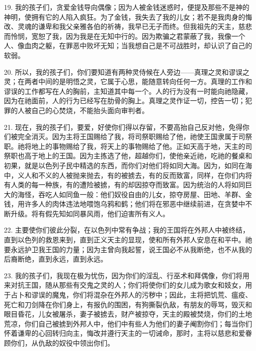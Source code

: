 19. 我的孩子们，贪爱金钱导向偶像；因为人被金钱迷惑时，便提及那些不是神的神明，使拥有它的人陷入疯狂。为了金钱，我失去了我的儿女；若不是我肉身的悔改、灵魂的谦卑和我父亲雅各伯的祈祷，我早已无子而终。但我祖先的天主，慈悲而怜悯，宽恕了我，因为我是在无知中行的。因为欺骗之君蒙蔽了我，我像一个人、像血肉之躯，在罪恶中败坏无知；当我想自己是不可战胜时，却认识了自己的软弱。\par

20. 所以，我的孩子们，你们要知道有两种灵侍候在人旁边——真理之灵和谬误之灵；在两者中间的是明悟之灵，它属于心思，能随意转向任何一方。真理的工作和谬误的工作都写在人的胸前，主知道其中每一个。人的行为没有一时能向祂隐藏，因为在祂面前，人的行为已经写在肋骨的胸上。真理之灵作证一切，控告一切；犯罪的人被自己的心焚烧，不能抬头面向审判者。\par

21. 现在，我的孩子们，要爱，好使你们得以存留，不要高抬自己反对他，免得你们被完全消灭。因为主将王国赐给了我，将司祭职赐给了他，祂使王国隶属于司祭职。祂将地上的事物赐给了我，将天上的事物赐给了他。正如天高于地，天主的司祭职也高于地上的王国。因为主拣选了他，超越你们，使他亲近祂，吃祂的餐桌和初果，就是以色列子民中精选的东西，而你们对他们将如同大海。因为，如同在海中，义人和不义的人被抛来抛去，有的被掳去，有的反而致富，同样，在你们内将有人类的每一种族，有的遭险被掳，有的却因掠夺而致富。因为统治的人将如同巨大的海怪，吞吃人如同鱼一般：他们奴役自由的儿女，掠夺房屋、田地、羊群、金钱，用许多人的肉体违法地喂饱乌鸦和鹤；他们将在邪恶中继续前进，在贪婪中不断升级。将有假先知如同暴风雨，他们迫害所有义人。\par

22. 主要使你们彼此分裂，在以色列中常有争战；我的王国将在外邦人中被终结，直到以色列的救恩来到，直到正义天主的显现，使和所有外邦人安息在和平中。祂要永远护卫我王国的力量；因为主曾向我起誓，说王国必不从我断绝，也不从我的后裔断绝，直到永远，直到永远。\par

23. 我的孩子们，我现在极为忧伤，因为你们的淫乱、行巫术和拜偶像，你们将用来对抗王国，随从那些有交鬼之灵的人；你们将使你们的女儿成为歌女和妓女，用于占卜和谬误的魔鬼，你们将混杂在外邦人的污秽中；因此，主将把饥荒、瘟疫、死亡和刀剑降在你们身上，有报仇的围困，有狗撕裂仇敌，有朋友的辱骂，毁灭和眼目昏花，儿女被屠杀，妻子被掳去，财产被掠夺，天主的殿被焚烧，你们的土地荒凉，你们自己被掳到外邦人中，他们中有些人为他们的妻子阉割你们；每当你们怀着谦卑的心回转归向主，悔改并遵行天主的一切诫命，那时，主将以慈悲和爱眷顾你们，从仇敌的奴役中领出你们。\par


